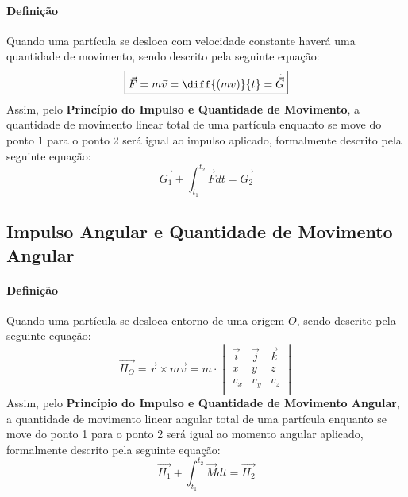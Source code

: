 \documentclass{article}
\begin{document}
            \paragraph{Definição}Quando uma partícula se desloca com velocidade constante haverá uma quantidade de movimento, sendo descrito pela seguinte equação:
                \begin{equation}
                    \boxed{
                        \vec{F} = m \vec{v} = \diff{(mv)}{t} = \dot{\vec{G}}
                    }
                \end{equation}
            Assim, pelo \textbf{Princípio do Impulso e Quantidade de Movimento}, a quantidade de movimento linear total de uma partícula enquanto se move do ponto 1 para o ponto 2 será igual ao impulso aplicado, formalmente descrito pela seguinte equação:
                \begin{equation}
                    \boxed{
                        \vec{G_{1}} + \int_{t_{1}}^{t_{2}} \vec{F} dt = \vec{G_{2}}
                    }
                \end{equation}

        \subsection{Impulso Angular e Quantidade de Movimento Angular}
            \paragraph{Definição}Quando uma partícula se desloca entorno de uma origem $O$, sendo descrito pela seguinte equação:
                \begin{equation}
                    \boxed{
                        \vec{H_{O}} = \vec{r} \times m\vec{v} = m \cdot
                        \begin{vmatrix}
                            \vec{i} & \vec{j} & \vec{k}\\
                            x       & y       & z\\
                            v_{x}   & v_{y}   & v_{z}\\
                        \end{vmatrix}
                    }
                \end{equation}
            Assim, pelo \textbf{Princípio do Impulso e Quantidade de Movimento Angular}, a quantidade de movimento linear angular total de uma partícula enquanto se move do ponto 1 para o ponto 2 será igual ao momento angular aplicado, formalmente descrito pela seguinte equação:
                \begin{equation}
                    \boxed{
                        \vec{H_{1}} + \int_{t_{1}}^{t_{2}} \vec{M} dt = \vec{H_{2}}
                    }
                \end{equation}
\end{document}
